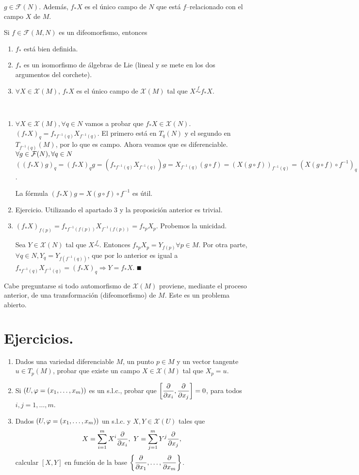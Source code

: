 \documentclass[Cursovd_portada.tex]{subfiles}
\begin{document}
$g\in \mathcal{F}(N)$. Además, $f_*X$ es el único campo de
$N$ que est\'a $f$--relacionado con el campo $X$ de $M$.
\begin{prop}
Si $f\in\mathcal{F}(M,N)$ es un difeomorfismo, entonces 
\begin{enumerate}
\item $f_*$ está bien definida.
\item $f_*$ es un isomorfismo de álgebras de Lie (lineal y se mete en los dos argumentos del corchete).
\item $\forall X\in\mathcal{X}(M)$, $f_*X$ es el único campo de $\mathcal{X}(M)$ tal que $X\overset{f}{\sim} f_*X$.
\end{enumerate}
\end{prop}
\begin{dem}\
\begin{enumerate}
\item $\forall X\in\mathcal{X}(M),\forall q\in N$ vamos a probar que $f_*X\in\mathcal{X}(N)$. $(f_*X)_q=f_{*f^{-1}(q)}X_{f^{-1}(q)}$. El primero está en $T_q(N)$ y el segundo en $T_{f^{-1}(q)}(M)$, por lo que es campo. Ahora veamos que es diferenciable.
$\forall g\in\mathcal{F}(N),\forall q\in N$ $((f_*X)g)_q=(f_*X)_qg=(f_{*f^{-1}(q)}X_{f^{-1}(q)})g=X_{f^{-1}(q)}(g\circ f)=(X(g\circ f))_{f^{-1}(q)}=(X(g\circ f)\circ f^{-1})_q$.

La fórmula $(f_*X)g=X(g\circ f)\circ f^{-1}$ es útil.
\item Ejercicio. Utilizando el apartado 3 y la proposición anterior es trivial.
\item $(f_*X)_{f(p)}=f_{*f^{-1}(f(p))}X_{f^{-1}(f(p))}=f_{*p}X_p$. Probemos la unicidad. 

Sea $Y\in\mathcal{X}(N)$ tal que $X\overset{f}{\sim}$. Entonces $f_{*p}X_p=Y_{f(p)}\forall p\in M$. Por otra parte, $\forall q\in N, Y_q=Y_{f(f^{-1}(q))}$, que por lo anterior es igual a $f_{*f^{-1}(q)}X_{f^{-1}(q)}=(f_*X)_q\Rightarrow Y=f_*X$. $\QED$
\end{enumerate}
\end{dem}
\begin{nota}
{\rm Cabe preguntarse si todo automorfismo de $\mathcal{X}(M)$ proviene, mediante el proceso anterior, de una
transformación (difeomorfismo) de $M$. Este es un problema abierto.}
\end{nota}
\section{Ejercicios.}
\begin{enumerate}
\item Dados una variedad diferenciable $M$, un punto $p\in M$ y un
vector tangente $u\in T_p(M)$, probar que existe un campo
$X\in\mathcal{X}(M)$ tal que $X_p=u$. \item Si $(U,\varphi=(x_1,\dots
,x_m))$ es un s.l.c., probar que
$\left[\displaystyle{\frac{\partial}{\partial x_i}},\displaystyle{\frac{\partial}{\partial x_j}}\right]=0$, para todos $i,j=1,\dots ,m$.
\item Dados $(U,\varphi=(x_1,\dots ,x_m))$ un s.l.c. y
$X,Y\in\mathcal{X}(U)$ tales que
$$X=\sum_{i=1}^mX^i\displaystyle{\frac{\partial}{\partial x_i}},\mbox{ }Y=\sum_{j=1}^mY^j\displaystyle{\frac{\partial}{\partial x_j}},$$
calcular $[X,Y]$ en función de la base $\left\{\displaystyle{\frac{\partial}{\partial x_1}},\dots ,\displaystyle{\frac{\partial}{\partial x_m}}\right\}$.
\end{enumerate}
\end{document}
